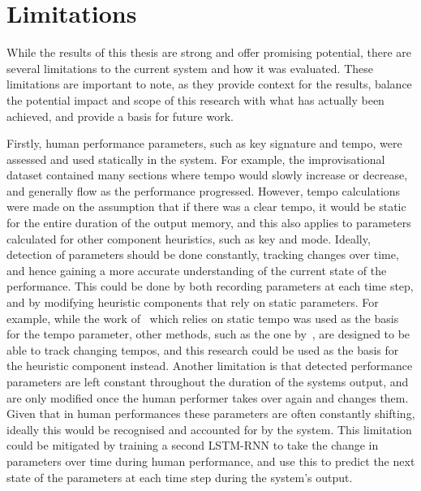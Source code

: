 \section{Limitations}
While the results of this thesis are strong and offer promising potential, there are several limitations to the current system and how it was evaluated. These limitations are important to note, as they provide context for the results, balance the potential impact and scope of this research with what has actually been achieved, and provide a basis for future work.

Firstly, human performance parameters, such as key signature and tempo, were assessed and used statically in the system. For example, the improvisational dataset contained many sections where tempo would slowly increase or decrease, and generally flow as the performance progressed. However, tempo calculations were made on the assumption that if there was a clear tempo, it would be static for the entire duration of the output memory, and this also applies to parameters calculated for other component heuristics, such as key and mode. Ideally, detection of parameters should be done constantly, tracking changes over time, and hence gaining a more accurate understanding of the current state of the performance. This could be done by both recording parameters at each time step, and by modifying heuristic components that rely on static parameters. For example, while the work of~\cite{Laroche2001TempoEstimation} which relies on static tempo was used as the basis for the tempo parameter, other methods, such as the one by~\cite{Scheirer1998TempoTracking}, are designed to be able to track changing tempos, and this research could be used as the basis for the heuristic component instead. Another limitation is that detected performance parameters are left constant throughout the duration of the systems output, and are only modified once the human performer takes over again and changes them. Given that in human performances these parameters are often constantly shifting, ideally this would be recognised and accounted for by the system. This limitation could be mitigated by training a second LSTM-RNN to take the change in parameters over time during human performance, and use this to predict the next state of the parameters at each time step during the system's output.


